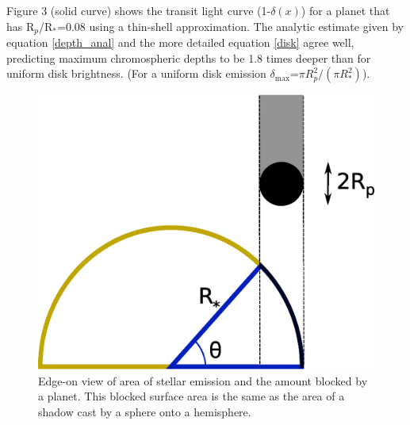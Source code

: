 \documentclass[twocolumn]{emulateapj}
\newcommand{\p}{R$_p$/R$_*$}
\begin{document}

Figure 3 (solid curve) shows the transit light curve (1-$\delta (x)$) for a planet that has \p =0.08 using a thin-shell approximation.  The analytic estimate given by equation \ref{depth_anal} and the more detailed equation \ref{disk} agree well, predicting maximum chromospheric depths to be 1.8 times
deeper than for uniform disk brightness. (For a uniform disk emission $\delta_{\mathrm{max}} $=$\pi R_p^2 /(\pi R_*^2)$). 



\begin{figure}
\begin{center}
\includegraphics[width=0.5 \textwidth]{chrom_shadow2.eps}
\caption{Edge-on view of area of stellar emission and the amount blocked by  a planet. This blocked surface area is the same as the area of a shadow cast by a sphere onto a hemisphere.}
\label{fig01}
\end{center}
\end{figure}
\end{document}
